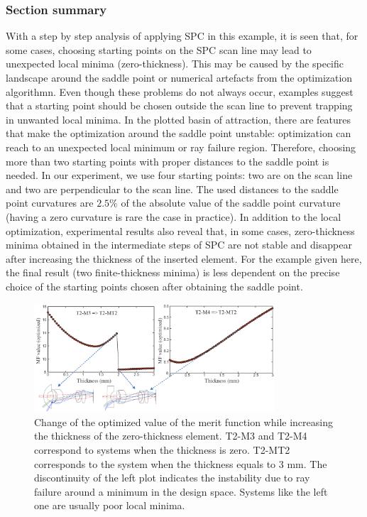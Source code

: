 \subsubsection{Section summary}
With a step by step analysis of applying SPC in this example, it is seen that, for some cases, choosing starting points on the SPC scan line may lead to unexpected local minima (zero-thickness). This may be caused by the specific landscape around the saddle point or numerical artefacts from the optimization algorithmn. Even though these problems do not always occur, examples suggest that a starting point should be chosen outside the scan line to prevent trapping in unwanted local minima. In the plotted basin of attraction, there are features that make the optimization around the saddle point unstable: optimization can reach to an unexpected local minimum or ray failure region. Therefore, choosing more than two starting points with proper distances to the saddle point is needed. In our experiment, we use four starting points: two are on the scan line and two are perpendicular to the scan line. The used distances to the saddle point curvatures are $2.5\%$ of the absolute value of the saddle point curvature (having a zero curvature is rare the case in practice). In addition to the local optimization, experimental results also reveal that, in some cases, zero-thickness minima obtained in the intermediate steps of SPC are not stable and disappear after increasing the thickness of the inserted element. For the example given here, the final result (two finite-thickness minima) is less dependent on the precise choice of the starting points chosen after obtaining the saddle point.  

\begin{figure}[h!]
    \centering
    \includegraphics[width=0.8\textwidth]{chapter-4/figures/thickness_increase.png}
    \caption{Change of the optimized value of the merit function while increasing the thickness of the zero-thickness element. T2-M3 and T2-M4 correspond to systems when the thickness is zero. T2-MT2 corresponds to the system when the thickness equals to 3 mm. The discontinuity of the left plot indicates the instability due to ray failure around a minimum in the design space. Systems like the left one are usually poor local minima.}
    \label{fig:thickness_increase}
\end{figure}

